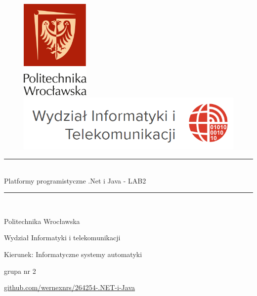 \documentclass{report}
\begin{document}
	\begin{titlepage}
		\begin{figure}[h]
			\begin{minipage}[l]{.5\textwidth}%
				\includegraphics[width=0.3\textwidth]{pwr_logo}
			\end{minipage}%
			\begin{minipage}[r]{.5\textwidth}%
				\includegraphics[width=1\textwidth]{wit_logo}
			\end{minipage}%
		\end{figure}
		
		\vspace*{3mm}
		
		\begin{center}
			\rule{\textwidth}{0.8pt}\\ 
			\vspace*{6mm}
			{\LARGE Platformy programistyczne .Net i Java - LAB2}\\
			\vspace*{3mm}
			\rule{\textwidth}{0.8pt}\\
			
			\vspace{1.5cm}
			{
				Politechnika Wrocławska
				
				Wydział Informatyki i telekomunikacji
				
				Kierunek: Informatyczne systemy automatyki
				
				grupa nr 2
				
				\href{https://github.com/wernexnrs/264254-.NET-i-Java}{github.com/wernexnrs/264254-.NET-i-Java}
				
}
\end{center}
\end{titlepage}
\end{document}
